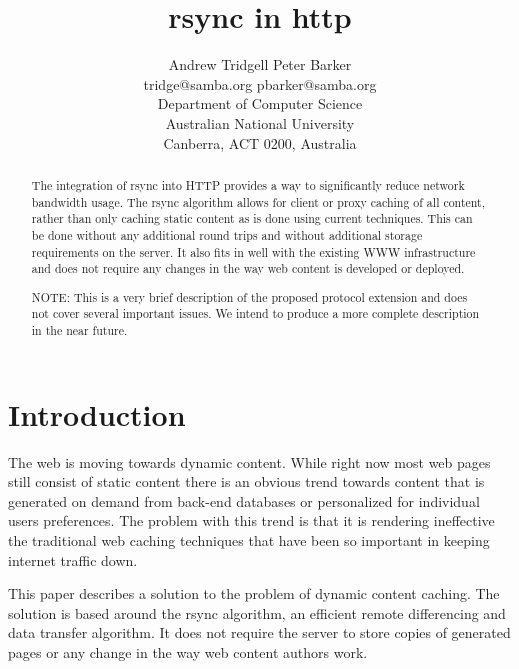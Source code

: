 \documentclass[a4paper]{article}
\begin{document}
\title{rsync in http}

\author{Andrew Tridgell \quad\quad Peter Barker\\
tridge@samba.org \quad\quad pbarker@samba.org\\
Department of Computer Science \\
Australian National University \\
Canberra, ACT 0200, Australia}

\maketitle

\begin{abstract}
  The integration of rsync into HTTP provides a way to significantly
  reduce network bandwidth usage. The rsync algorithm allows for client
  or proxy caching of all content, rather than only caching static
  content as is done using current techniques. This can be done
  without any additional round trips and without additional storage
  requirements on the server. It also fits in well with the existing
  WWW infrastructure and does not require any changes in the way web
  content is developed or deployed.
  
  NOTE: This is a very brief description of the proposed protocol
  extension and does not cover several important issues. We intend to
  produce a more complete description in the near future.
\end{abstract}

\section*{Introduction}

The web is moving towards dynamic content. While right now most web
pages still consist of static content there is an obvious trend
towards content that is generated on demand from back-end databases or
personalized for individual users preferences. The problem with this
trend is that it is rendering ineffective the traditional web caching
techniques that have been so important in keeping internet traffic
down.

This paper describes a solution to the problem of dynamic content
caching. The solution is based around the rsync algorithm, an
efficient remote differencing and data transfer algorithm. It does not
require the server to store copies of generated pages or any change in
the way web content authors work.
\end{document}
